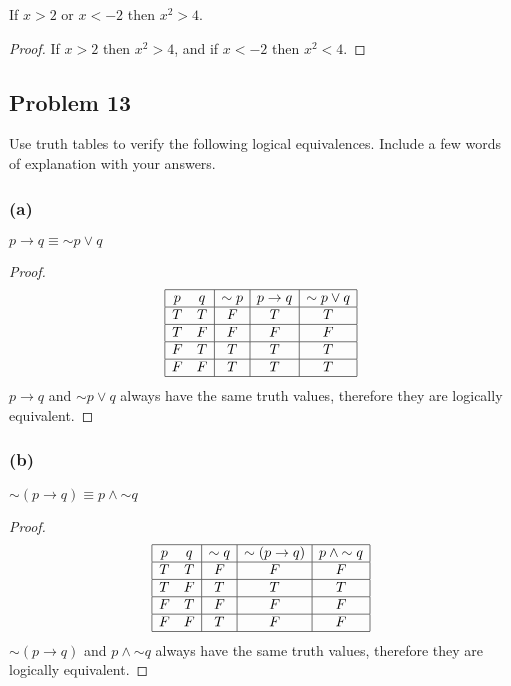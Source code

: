 \documentclass[14pt]{extarticle}
\begin{document}
\begin{center}
If $x > 2$ or $x < -2$ then $x^2 > 4$.
\end{center}

\begin{proof}
If $x > 2$ then $x^2 > 4$, and if $x < -2$ then $x^2 < 4$.
\end{proof}

\subsection{Problem 13}
Use truth tables to verify the following logical equivalences. Include a few
words of explanation with your answers.

\subsubsection{(a)}
$p \to q \equiv {\sim p} \vee q$

\begin{proof}
$$
\begin{array}{|cc|c|c|c|}
\hline
p & q & {\sim p} & p \to q & {\sim p} \vee q \\
\hline
T & T & F & T & T \\
\hline
T & F & F & F & F \\
\hline
F & T & T & T & T \\
\hline
F & F & T & T & T \\
\hline
\end{array}
$$
$p \to q$ and ${\sim p} \vee q$ always have the same truth values, therefore
they are logically equivalent.
\end{proof}

\subsubsection{(b)}
${\sim (p \to q)} \equiv p \wedge {\sim q}$

\begin{proof}
$$
\begin{array}{|cc|c|c|c|}
\hline
p & q & {\sim q} & {\sim (p \to q)} & p \wedge {\sim q} \\
\hline
T & T & F & F & F \\
\hline
T & F & T & T & T \\
\hline
F & T & F & F & F \\
\hline
F & F & T & F & F \\
\hline
\end{array}
$$
${\sim (p \to q)}$ and $p \wedge {\sim q}$ always have the same truth values,
therefore they are logically equivalent.
\end{proof}
\end{document}
